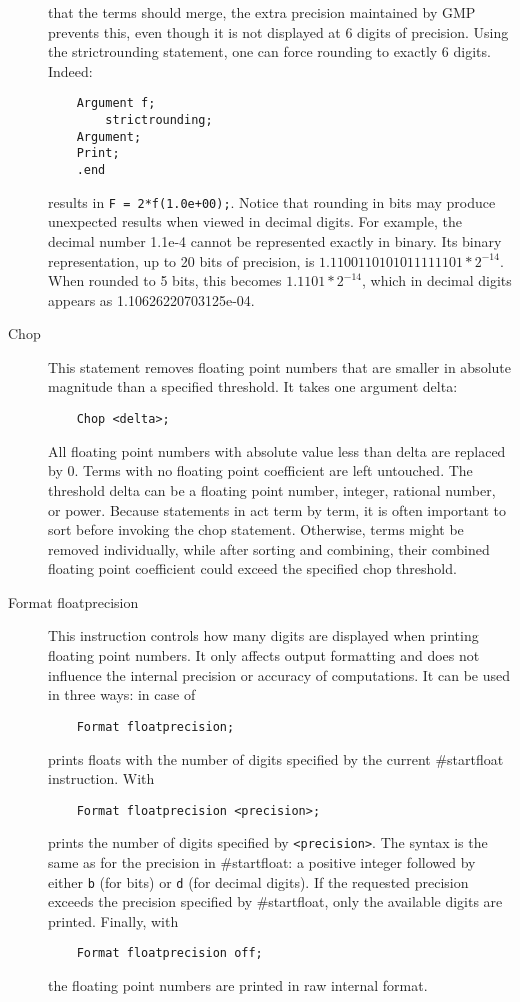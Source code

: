 \begin{description}
that the terms should merge, the extra precision maintained by GMP 
prevents this, even though it is not displayed at 6 digits of 
precision. Using the strictrounding statement, one can force rounding 
to exactly 6 digits. Indeed:
\begin{verbatim}
    Argument f;
        strictrounding;
    Argument;
    Print;
    .end
\end{verbatim}
results in \texttt{F = 2*f(1.0e+00);}.
Notice that rounding in bits may produce unexpected results when viewed 
in decimal digits. For example, the decimal number 1.1e-4 cannot be 
represented exactly in binary. Its binary representation, up to 20 bits of precision, is 
$1.1100110101011111101*2^{-14}$. When rounded to 5 bits, this becomes 
$1.1101*2^{-14}$, which in decimal digits appears as 
1.10626220703125e-04.
\item[Chop] This statement removes floating point numbers that are smaller 
in absolute magnitude than a specified threshold. It takes one argument delta:
\begin{verbatim}
    Chop <delta>;
\end{verbatim}
All floating point numbers with absolute value less than delta are replaced by 0. 
Terms with no floating point coefficient are left untouched. The threshold delta 
can be a floating point number, integer, rational number, or power. Because 
statements in \FORM{} act term by term, it is often important to sort before invoking the 
chop statement. Otherwise, terms might be removed individually, while after 
sorting and combining, their combined floating point coefficient could exceed 
the specified chop threshold. 
\item[Format floatprecision] This instruction controls how many digits are 
displayed when printing floating point numbers. It only affects output 
formatting and does not influence the internal precision or accuracy of 
computations. It can be used in three ways: in case of 
\begin{verbatim}
    Format floatprecision;
\end{verbatim}
\FORM{} prints floats with the number of digits specified by the current 
\#startfloat instruction. With
\begin{verbatim}
    Format floatprecision <precision>;
\end{verbatim}
\FORM{} prints the number of digits specified by \texttt{<precision>}. 
The syntax is the same as for the precision in \#startfloat: a positive 
integer followed by either \texttt{b} (for bits) or \texttt{d} (for decimal 
digits). If the requested precision exceeds the precision specified by 
\#startfloat, only the available digits are printed. Finally, with 
\begin{verbatim}
    Format floatprecision off;
\end{verbatim}
the floating point numbers are printed in raw internal format. 
\end{description}

